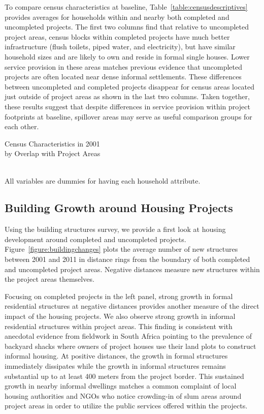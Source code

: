 \documentclass[12pt]{article}
\begin{document}
To compare census characteristics at baseline, Table~\ref{table:censusdescriptives} provides averages for households within and nearby both completed and uncompleted projects.  The first two columns find that relative to uncompleted project areas, census blocks within completed projects have much better infrastructure (flush toilets, piped water, and electricity), but have similar household sizes and are likely to own and reside in formal single houses.  Lower service provision in these areas matches previous evidence that uncompleted projects are often located near dense informal settlements.  These differences between uncompleted and completed projects disappear for census areas located just outside of project areas as shown in the last two columns.  Taken together, these results suggest that despite differences in service provision within project footprints at baseline, spillover areas may serve as useful comparison groups for each other.

\begin{table}
\caption{Census Characteristics in 2001 \\ by Overlap with Project Areas}\label{table:censusdescriptives}
\centering
 \\
All variables are dummies for having each household attribute.
\end{table}

\subsection{Building Growth around Housing Projects}

Using the building structures survey, we provide a first look at housing development around completed and uncompleted projects.  Figure~\ref{figure:buildingchanges} plots the average number of new structures between 2001 and 2011 in distance rings from the boundary of both completed and uncompleted project areas.  Negative distances measure new structures within the project areas themselves.  

Focusing on completed projects in the left panel, strong growth in formal residential structures at negative distances provides another measure of the direct impact of the housing projects.  We also observe strong growth in informal residential structures within project areas.  This finding is consistent with anecdotal evidence from fieldwork in South Africa pointing to the prevalence of backyard shacks where owners of project houses use their land plots to construct informal housing.  At positive distances, the growth in formal structures immediately dissipates while the growth in informal structures remains substantial up to at least 400 meters from the project border.  This sustained growth in nearby informal dwellings matches a common complaint of local housing authorities and NGOs who notice crowding-in of slum areas around project areas in order to utilize the public services offered within the projects.  	
\end{document}
